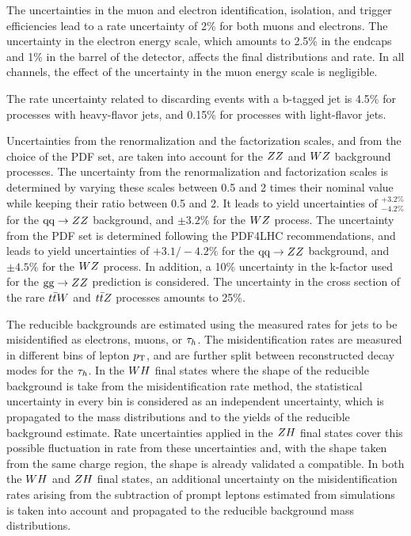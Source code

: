 The uncertainties in the muon and electron identification, isolation, and trigger 
efficiencies lead to a rate uncertainty of 2\% for both muons and electrons.
The uncertainty in the electron energy scale, which amounts to 2.5\% in the endcaps 
and 1\% in the barrel of the detector, affects the final distributions and rate.
In all channels, the effect of the uncertainty in
the muon energy scale is negligible.

The rate uncertainty related to discarding events with a b-tagged jet is
4.5\% for processes with heavy-flavor jets, and 0.15\% for processes with light-flavor jets.

Uncertainties from the renormalization and the factorization scales, and from the 
choice of the PDF set, are taken into account for the $ZZ$ and $WZ$ 
background processes. The uncertainty from the renormalization and factorization 
scales is determined by varying these scales between 0.5 and 2 times their nominal 
value while keeping their ratio between 0.5 and 2. It leads to yield uncertainties 
of $^{+3.2\%}_{-4.2\%}$ for the $\text{q}\text{q}\rightarrow ZZ$ background, and $\pm 3.2\%$ 
for the $WZ$ process. The uncertainty from the PDF set is determined following 
the PDF4LHC recommendations, and leads to yield uncertainties of $+3.1/-4.2\%$ for 
the $\text{q}\text{q}\rightarrow ZZ$ background, and $\pm 4.5\%$ for the $WZ$ process. 
In addition, a 10\% uncertainty in the k-factor used for the $\text{g}\text{g} \rightarrow 
ZZ$  prediction is considered.  The uncertainty in the cross section of the 
rare $t\bar{t}W$ and $t\bar{t}Z$ processes amounts to 25\%.

The reducible backgrounds are estimated using the measured rates for jets to be 
misidentified as electrons, muons, or $\tau_{h}$. The misidentification rates are 
measured in different bins of lepton $p_\mathrm{T}$, and are further split between 
reconstructed decay modes for the $\tau_{h}$. In the $WH$ final states where
the shape of the reducible background is take from the misidentification rate
method, the statistical uncertainty in every 
bin is considered as an independent uncertainty, which is propagated to the mass 
distributions and to the yields of the reducible background estimate. Rate
uncertainties applied in the $ZH$ final states cover this possible fluctuation
in rate from these uncertainties and, with the shape taken from the same charge
region, the shape is already validated a compatible.
In both the $WH$ and $ZH$ final states, an additional
uncertainty on the misidentification rates arising from the subtraction of 
prompt leptons estimated from simulations is taken into account and propagated to 
the reducible background mass distributions. 

